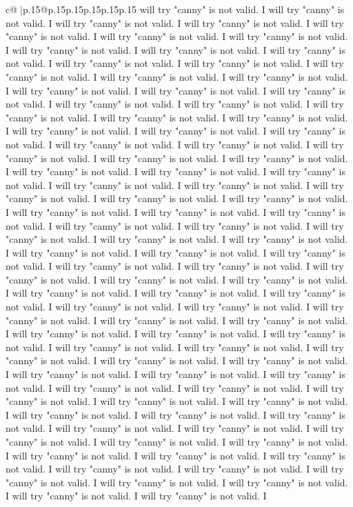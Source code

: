 \documentclass{article}
\begin{document}
{\begin{supertabular}{c@{$\;$}|p{.15\linewidth}@{}p{.15\linewidth}p{.15\linewidth}p{.15\linewidth}p{.15\linewidth}p{.15\linewidth}}
{{{will try "canny" is not valid. I will try "canny" is not valid. I will try "canny" is not valid. I will try "canny" is not valid. I will try "canny" is not valid. I will try "canny" is not valid. I will try "canny" is not valid. I will try "canny" is not valid. I will try "canny" is not valid. I will try "canny" is not valid. I will try "canny" is not valid. I will try "canny" is not valid. I will try "canny" is not valid. I will try "canny" is not valid. I will try "canny" is not valid. I will try "canny" is not valid. I will try "canny" is not valid. I will try "canny" is not valid. I will try "canny" is not valid. I will try "canny" is not valid. I will try "canny" is not valid. I will try "canny" is not valid. I will try "canny" is not valid. I will try "canny" is not valid. I will try "canny" is not valid. I will try "canny" is not valid. I will try "canny" is not valid. I will try "canny" is not valid. I will try "canny" is not valid. I will try "canny" is not valid. I will try "canny" is not valid. I will try "canny" is not valid. I will try "canny" is not valid. I will try "canny" is not valid. I will try "canny" is not valid. I will try "canny" is not valid. I will try "canny" is not valid. I will try "canny" is not valid. I will try "canny" is not valid. I will try "canny" is not valid. I will try "canny" is not valid. I will try "canny" is not valid. I will try "canny" is not valid. I will try "canny" is not valid. I will try "canny" is not valid. I will try "canny" is not valid. I will try "canny" is not valid. I will try "canny" is not valid. I will try "canny" is not valid. I will try "canny" is not valid. I will try "canny" is not valid. I will try "canny" is not valid. I will try "canny" is not valid. I will try "canny" is not valid. I will try "canny" is not valid. I will try "canny" is not valid. I will try "canny" is not valid. I will try "canny" is not valid. I will try "canny" is not valid. I will try "canny" is not valid. I will try "canny" is not valid. I will try "canny" is not valid. I will try "canny" is not valid. I will try "canny" is not valid. I will try "canny" is not valid. I will try "canny" is not valid. I will try "canny" is not valid. I will try "canny" is not valid. I will try "canny" is not valid. I will try "canny" is not valid. I will try "canny" is not valid. I will try "canny" is not valid. I will try "canny" is not valid. I will try "canny" is not valid. I will try "canny" is not valid. I will try "canny" is not valid. I will try "canny" is not valid. I will try "canny" is not valid. I will try "canny" is not valid. I will try "canny" is not valid. I will try "canny" is not valid. I will try "canny" is not valid. I will try "canny" is not valid. I will try "canny" is not valid. I will try "canny" is not valid. I will try "canny" is not valid. I will try "canny" is not valid. I will try "canny" is not valid. I will try "canny" is not valid. I will try "canny" is not valid. I will try "canny" is not valid. I will try "canny" is not valid. I will try "canny" is not valid. I will try "canny" is not valid. I will try "canny" is not valid. I will try "canny" is not valid. I will try "canny" is not valid. I }}}
\end{supertabular}}
\end{document}
